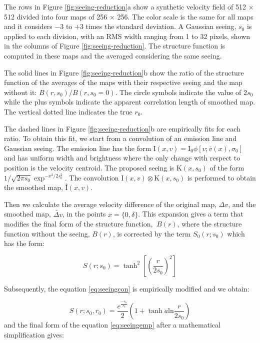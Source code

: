 \documentclass[fleqn,usenatbib, useAMS, a4paper]{mnras}
\begin{document}
The rows in Figure \ref{fig:seeing-reduction}a show a synthetic velocity field of 512 \(\times\) 512 divided into four maps of 256 \(\times \) 256.
The color scale is the same for all maps and it considers \(- 3\) to \(+ 3\) times the standard deviation.
A Gaussian seeing, \(s_0 \) is applied to each division, with an RMS width ranging from 1 to 32 pixels, shown in the columns of Figure \ref{fig:seeing-reduction}. 
The structure function is computed in these maps and the averaged considering the same seeing. 

The solid lines in Figure \ref{fig:seeing-reduction}b  show the ratio of the structure function of the averages of the maps with their respective seeing and the map without it: \(B (r, s_0 ) / B (r, s_0 = 0) \).
The circle symbols indicate the value of 2\(s_0\) while the plus symbols indicate the apparent correlation length of smoothed map.
The vertical dotted line indicates the true \(r_ {0} \). 

The dashed lines in Figure \ref{fig:seeing-reduction}b are  empirically fits for each ratio.
To obtain this fit, we start from a convolution of an emission line and Gaussian seeing.
The emission line has the form \(\text {I}(x, v) = \text{I}_0 \phi [v; \overline {v} (x), \sigma_0]\) and has uniform width and brightness where the only change with respect to position is the velocity centroid.
The proposed seeing is \(\text{K}(x, s_0)\) of the form \(1 / \sqrt{2 \pi s_0} \exp^ {-x^ 2 / 2s_0 ^ 2} \).
The convolution \(\text{I}(x, v) \otimes \text{K}(x, s_0) \) is performed to obtain the smoothed map, \(\text {\~I} (x, v) \). 

Then we calculate the average velocity difference of the original map, \(\Delta v \), and the smoothed map, \(\tilde{\Delta v}\), in the points \( x = \{0, \delta \} \).
This expansion gives a term that modifies the final form of the structure function, \(~B (r)\), where the structure function without the seeing, \(B(r) \), is corrected by the term \(S_0(r; s_0)\) which has the form: 

\begin{equation}\label{eq:seeingcon}
S (r;s_0) = \tanh^2 \left[ \left( \dfrac{r}{2s_0} \right)^2 \right]
\end{equation}

Subsequently, the equation \ref{eq:seeingcon} is empirically modified and we obtain: 

\begin{equation}\label{eq:seeingemp}
S(r; s_0, r_0) =  \frac{e^\frac{-s_0}{r_0}}{2} \left(1 + \tanh{a \text{ln} \frac{r}{2s_0}} \right)
\end{equation}
%
and the final form of the equation \ref{eq:seeingemp} after a mathematical simplification gives: 
\end{document}

